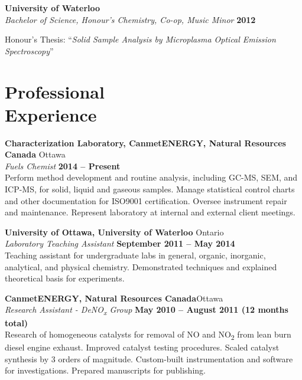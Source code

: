 \documentclass[margin,line]{resume}
\begin{document}
\begin{resume}
    \textbf{University of Waterloo}\\\vspace{1mm}%
    \textsl{Bachelor of Science, Honour's Chemistry, Co-op, Music Minor} \hfill \textbf{2012}\vspace{-3mm}\\\vspace{-1mm}%
    \begin{list2}
        \item Honour's Thesis: ``\textit{Solid Sample Analysis by Microplasma Optical Emission Spectroscopy}''
    \end{list2}

    \section{\mysidestyle Professional\\Experience}

    \textbf{Characterization Laboratory, CanmetENERGY, Natural Resources Canada} \hfill Ottawa \\\vspace{1mm}%
    \textsl{Fuels Chemist} \hfill \textbf{2014 -- Present}\\
    Perform method development and routine analysis, including GC-MS, SEM, and ICP-MS, for solid, liquid and gaseous samples. Manage statistical control charts and other documentation for ISO9001 certification. Oversee instrument repair and maintenance. Represent laboratory at internal and external client meetings. 
    

    \textbf{University of Ottawa, University of Waterloo} \hfill Ontario \\\vspace{1mm}%
    \textsl{Laboratory Teaching Assistant} \hfill \textbf{September 2011 -- May 2014}\\
    Teaching assistant for undergraduate labs in general, organic, inorganic, analytical, and physical chemistry. Demonstrated techniques and explained theoretical basis for experiments.

    \textbf{CanmetENERGY, Natural Resources Canada}\hfill Ottawa \\\vspace{1mm}%
    \textsl{Research Assistant - DeNO\textsubscript{x} Group} \hfill \textbf{May 2010 -- August 2011 (12 months total)}\\
    Research of homogeneous catalysts for removal of NO and NO\textsubscript{2} from lean burn diesel engine exhaust. Improved catalyst testing procedures. Scaled catalyst synthesis by 3 orders of magnitude. Custom-built instrumentation and software for investigations.  Prepared manuscripts for publishing.


\end{resume}
\end{document}
